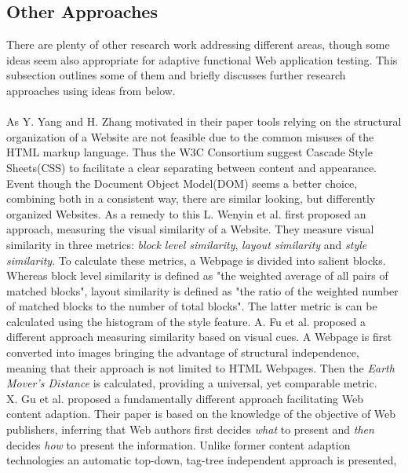 \documentclass[12pt, notitlepage]{article}
\begin{document}
\subsection{Other Approaches}
There are plenty of other research work addressing different areas, though some ideas seem also appropriate for adaptive functional
Web application testing. This subsection outlines some of them and briefly discusses further research approaches using ideas from
below.\\\\
As Y. Yang and H. Zhang\cite{page-analysis_visual} motivated in their paper tools relying on the structural organization of a
Website are not feasible due to the common misuses of the HTML markup language. Thus the W3C Consortium suggest Cascade Style Sheets(CSS\cite{css3}) to facilitate a clear separating between content and appearance. Event though the Document Object Model(DOM\cite{dom})
seems a better choice, combining both in a consistent way, there are similar looking, but differently organized Websites.  
As a remedy to this L. Wenyin et al.\cite{phishing-visual} first proposed an approach, measuring the visual similarity of a Website.
They measure visual similarity in three metrics: \textit{block level similarity}, \textit{layout similarity} and
\textit{style similarity}. To calculate these metrics, a Webpage is divided into salient blocks. Whereas block level similarity is defined as "the weighted average of all pairs of matched blocks", layout similarity is defined as "the ratio of the weighted number
of matched blocks to the number of total blocks". The latter metric is can be calculated using the histogram of the style feature. 
A. Fu et al.\cite{emd} proposed a different approach measuring similarity based on visual cues. A Webpage is first converted into 
images bringing the advantage of structural independence, meaning that their approach is not limited to HTML Webpages. Then the
\textit{Earth Mover's Distance}\cite{emd-def} is calculated, providing a universal, yet comparable metric. \\
X. Gu et al.\cite{understanding-web-adaption} proposed a fundamentally different approach facilitating Web content adaption. 
Their paper is based on the knowledge of the objective of Web publishers, inferring that Web authors first decides \textit{what}
to present and \textit{then} decides \textit{how} to present the information. Unlike former content adaption
technologies\cite{function-object-model, adaptive-html-delivery} an automatic top-down, tag-tree independent approach is presented,
\end{document}
